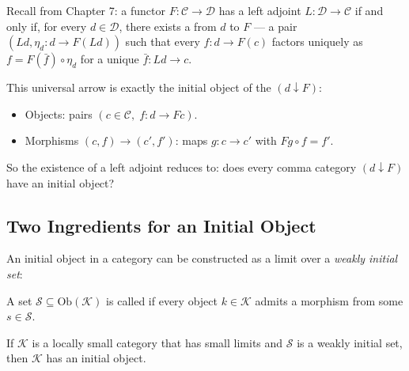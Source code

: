 Recall from Chapter 7: a functor $F : \mathcal{C} \to \mathcal{D}$ has
a left adjoint $L : \mathcal{D} \to \mathcal{C}$ if and only if, for
every $d \in \mathcal{D}$, there exists a  from $d$
to $F$ --- a pair $(Ld, \eta_d : d \to F(Ld))$ such that every $f : d
\to F(c)$ factors uniquely as $f = F(\bar f) \circ \eta_d$ for a unique
$\bar f : Ld \to c$.

This universal arrow is exactly the initial object of the
 $(d \downarrow F)$:
\begin{itemize}
  \item Objects: pairs $(c \in \mathcal{C}, \; f : d \to Fc)$.
  \item Morphisms $(c, f) \to (c', f')$: maps $g : c \to c'$ with
        $Fg \circ f = f'$.
\end{itemize}

So the existence of a left adjoint reduces to: does every comma category
$(d \downarrow F)$ have an initial object?

\subsection{Two Ingredients for an Initial Object}

An initial object in a category can be constructed as a limit over a
\emph{weakly initial set}:

\begin{definition}
A set $\mathcal{S} \subseteq \mathrm{Ob}(\mathcal{K})$ is called
 if every object $k \in \mathcal{K}$ admits a
morphism from some $s \in \mathcal{S}$.
\end{definition}

\begin{lemma}
\label{lem:weakly-initial}
If $\mathcal{K}$ is a locally small category that has small limits and
$\mathcal{S}$ is a weakly initial set, then $\mathcal{K}$ has an initial
object.
\end{lemma}

